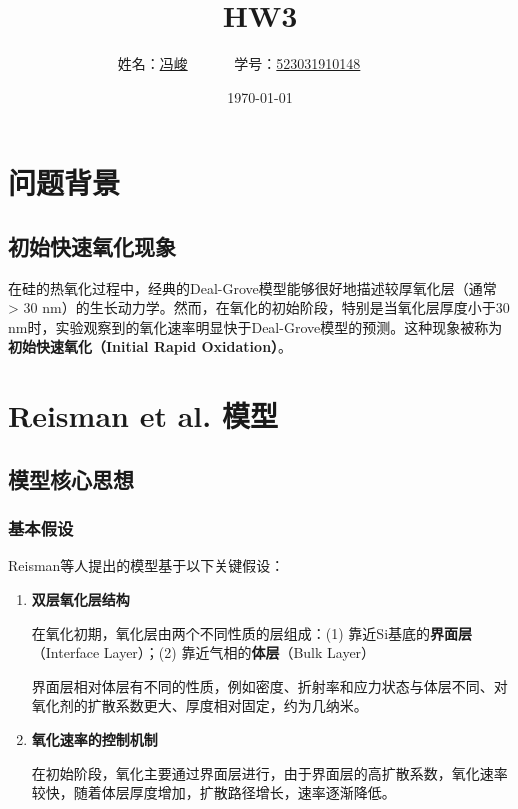 \documentclass[UTF8,12pt,a4paper]{ctexart}
\title{HW3}
\author{
	姓名：\underline{冯峻}~~~~~~
	学号：\underline{523031910148}~~~~~~}
\date{\today}
\begin{document}
\fancyfoot[C]{\thepage}

\maketitle

\section{问题背景}

\subsection{初始快速氧化现象}

在硅的热氧化过程中，经典的Deal-Grove模型能够很好地描述较厚氧化层（通常 > 30 nm）的生长动力学。然而，在氧化的初始阶段，特别是当氧化层厚度小于30 nm时，实验观察到的氧化速率明显快于Deal-Grove模型的预测。这种现象被称为\textbf{初始快速氧化（Initial Rapid Oxidation）}。

\section{Reisman et al. 模型}

\subsection{模型核心思想}

\subsubsection{基本假设}

Reisman等人提出的模型基于以下关键假设：

\begin{enumerate}
    \item \textbf{双层氧化层结构}
  
    在氧化初期，氧化层由两个不同性质的层组成：(1) 靠近Si基底的\textbf{界面层}（Interface Layer）；(2) 靠近气相的\textbf{体层}（Bulk Layer）
    
    界面层相对体层有不同的性质，例如密度、折射率和应力状态与体层不同、对氧化剂的扩散系数更大、厚度相对固定，约为几纳米。

    \item \textbf{氧化速率的控制机制}
   
    在初始阶段，氧化主要通过界面层进行，由于界面层的高扩散系数，氧化速率较快，随着体层厚度增加，扩散路径增长，速率逐渐降低。
    
\end{enumerate}
\end{document}
